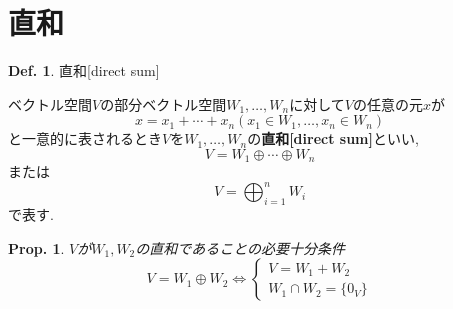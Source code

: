\documentclass[a4paper,10pt,report]{amsart}
\theoremstyle{plain}
\newtheorem{prop}{Prop.}[section]
\theoremstyle{definition}
\newtheorem{defn}{Def.}[section]
\theoremstyle{remark}
\begin{document}
\section{直和}
\begin{leftbar}
    \begin{defn}直和[direct sum] \par
        ベクトル空間\(V\)の部分ベクトル空間\(W_{1},\ldots,W_{n}\)に対して\(V\)の任意の元\(x\)が
        \begin{equation}
            x=x_{1}+\cdots+x_{n}(x_{1}\in W_{1},\ldots,x_{n}\in W_{n})
        \end{equation}
        と一意的に表されるとき\(V\)を\(W_{1},\ldots,W_{n}\)の\textbf{直和[direct sum]}といい, 
        \begin{equation}
            V=W_{1}\oplus\cdots\oplus W_{n}
        \end{equation}
        または
        \begin{equation}
            V=\bigoplus_{i=1}^{n}W_{i}
        \end{equation}
        で表す.
    \end{defn}
\end{leftbar}
\begin{leftbar}
    \begin{prop}\(V\)が\(W_{1},W_{2}\)の直和であることの必要十分条件
        \begin{equation}
            V=W_{1}\oplus{}W_{2}\Leftrightarrow
            \begin{cases}
                V=W_{1}+W_{2}\\
                W_{1}\cap{}W_{2}=\{0_{V}\}
            \end{cases}
        \end{equation}
    \end{prop}
\end{leftbar}
\end{document}
